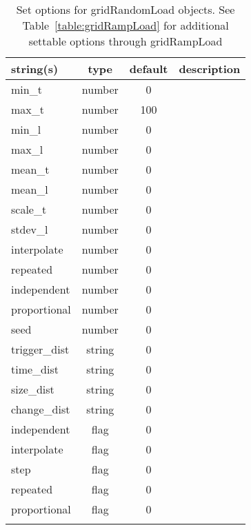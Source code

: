 \begin{longtable}{p{5cm} c c p{7cm}}
string(s) & type & default & description \\
\hline
min\_t & number & 0 & \\
max\_t & number & 100 & \\
min\_l & number & 0 & \\
max\_l & number & 0 & \\
mean\_t & number & 0 & \\
mean\_l & number & 0 & \\
scale\_t & number & 0 & \\
stdev\_l & number & 0 & \\
interpolate & number & 0 & \\
repeated & number & 0 & \\
independent & number & 0 & \\
proportional & number & 0 & \\
seed & number & 0 & \\
trigger\_dist & string & 0 & \\
time\_dist & string & 0 & \\
size\_dist & string & 0 & \\
change\_dist & string & 0 & \\
independent & flag & 0 & \\
interpolate & flag & 0 & \\
step & flag & 0 & \\
repeated & flag & 0 & \\
proportional & flag & 0 & \\
\hline
\caption{Set options for gridRandomLoad objects. See Table~\ref{table:gridRampLoad} for additional settable options through gridRampLoad}
\label{table:gridRandomLoad}
\end{longtable}

